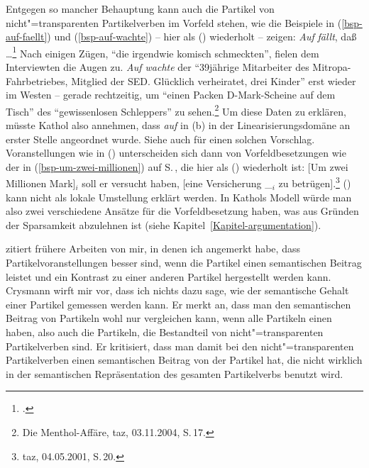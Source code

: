 Entgegen so mancher Behauptung kann auch die Partikel von nicht"=transparenten Partikelverben im
Vorfeld stehen, wie die Beispiele in (\ref{bsp-auf-faellt}) und (\ref{bsp-auf-wachte}) -- hier als ()
wiederholt -- zeigen:
\eal
\ex{}
\emph{Auf} \emph{fällt}, daß \ldots\footnote{
        .%
}
\ex Nach einigen Zügen, "`die irgendwie komisch schmeckten"', fielen dem Interviewten die Augen zu. 
\emph{Auf wachte} der "`39jährige Mitarbeiter des Mitropa-Fahrbetriebes, Mitglied der SED. Glücklich verheiratet, drei Kinder"'
erst wieder im Westen -- gerade rechtzeitig, um "`einen Packen D-Mark-Scheine auf dem Tisch"' 
des "`gewissenlosen Schleppers"' zu sehen.\footnote{
  Die Menthol-Affäre, taz, 03.11.2004, S.\,17.%
}
\zl
Um diese Daten zu erklären, müsste Kathol also annehmen, dass \emph{auf} in (b)
in der Linearisierungsdomäne an erster Stelle angeordnet wurde. Siehe auch 
für einen solchen Vorschlag.
Voranstellungen wie in () unterscheiden sich dann von Vorfeldbesetzungen wie der in 
(\ref{bsp-um-zwei-millionen}) auf S.\,\pageref{bsp-um-zwei-millionen},
die hier als () wiederholt ist:
\ea\label{bsp-um-zwei-millionen-zwei}
{}[Um zwei Millionen Mark]$_i$ soll er versucht haben, [eine Versicherung \_$_i$ zu betrügen].\footnote{
         taz, 04.05.2001, S.\,20.
}
\z
() kann nicht als lokale Umstellung erklärt werden.
In Kathols Modell würde man also zwei verschiedene Ansätze für die Vorfeldbesetzung haben,
was aus Gründen der Sparsamkeit abzulehnen ist (siehe Kapitel~\ref{Kapitel-argumentation}).

\citet[Abschnitt~4.2]{Crysmann2002a} zitiert frühere Arbeiten von mir, in denen ich angemerkt
habe, dass Partikelvoranstellungen besser sind, wenn die Partikel einen semantischen
Beitrag leistet und ein Kontrast zu einer anderen Partikel hergestellt werden kann.
\eal
{}
\zl
Crysmann wirft mir vor, dass ich nichts dazu sage, wie der semantische
Gehalt einer Partikel gemessen werden kann. Er merkt an, dass man den semantischen
Beitrag von Partikeln wohl nur vergleichen kann, wenn alle Partikeln einen
\contw haben, also auch die Partikeln, die Bestandteil von nicht"=transparenten
Partikelverben sind. Er kritisiert, dass man damit bei den nicht"=transparenten
Partikelverben einen semantischen Beitrag von der Partikel hat, die nicht wirklich
in der semantischen Repräsentation des gesamten Partikelverbs benutzt wird. 

